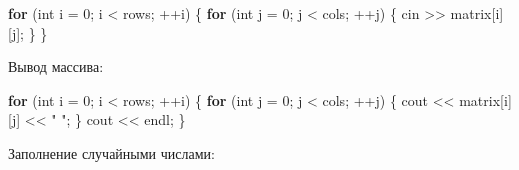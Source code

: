 \documentclass[
]{article}
\newenvironment{Shaded}{}{}
\newcommand{\ControlFlowTok}[1]{\textcolor[rgb]{0.00,0.44,0.13}{\textbf{#1}}}
\newcommand{\DataTypeTok}[1]{\textcolor[rgb]{0.56,0.13,0.00}{#1}}
\newcommand{\DecValTok}[1]{\textcolor[rgb]{0.25,0.63,0.44}{#1}}
\newcommand{\NormalTok}[1]{#1}
\newcommand{\OperatorTok}[1]{\textcolor[rgb]{0.40,0.40,0.40}{#1}}
\newcommand{\StringTok}[1]{\textcolor[rgb]{0.25,0.44,0.63}{#1}}
\begin{document}
\begin{enumerate}
\begin{Shaded}
\begin{Highlighting}[]
\ControlFlowTok{for} \OperatorTok{(}\DataTypeTok{int}\NormalTok{ i }\OperatorTok{=} \DecValTok{0}\OperatorTok{;}\NormalTok{ i }\OperatorTok{\textless{}}\NormalTok{ rows}\OperatorTok{;} \OperatorTok{++}\NormalTok{i}\OperatorTok{)} \OperatorTok{\{}
    \ControlFlowTok{for} \OperatorTok{(}\DataTypeTok{int}\NormalTok{ j }\OperatorTok{=} \DecValTok{0}\OperatorTok{;}\NormalTok{ j }\OperatorTok{\textless{}}\NormalTok{ cols}\OperatorTok{;} \OperatorTok{++}\NormalTok{j}\OperatorTok{)} \OperatorTok{\{}
\NormalTok{        cin }\OperatorTok{\textgreater{}\textgreater{}}\NormalTok{ matrix}\OperatorTok{[}\NormalTok{i}\OperatorTok{][}\NormalTok{j}\OperatorTok{];}
    \OperatorTok{\}}
\OperatorTok{\}}
\end{Highlighting}
\end{Shaded}

  Вывод массива:

\begin{Shaded}
\begin{Highlighting}[]
\ControlFlowTok{for} \OperatorTok{(}\DataTypeTok{int}\NormalTok{ i }\OperatorTok{=} \DecValTok{0}\OperatorTok{;}\NormalTok{ i }\OperatorTok{\textless{}}\NormalTok{ rows}\OperatorTok{;} \OperatorTok{++}\NormalTok{i}\OperatorTok{)} \OperatorTok{\{}
    \ControlFlowTok{for} \OperatorTok{(}\DataTypeTok{int}\NormalTok{ j }\OperatorTok{=} \DecValTok{0}\OperatorTok{;}\NormalTok{ j }\OperatorTok{\textless{}}\NormalTok{ cols}\OperatorTok{;} \OperatorTok{++}\NormalTok{j}\OperatorTok{)} \OperatorTok{\{}
\NormalTok{        cout }\OperatorTok{\textless{}\textless{}}\NormalTok{ matrix}\OperatorTok{[}\NormalTok{i}\OperatorTok{][}\NormalTok{j}\OperatorTok{]} \OperatorTok{\textless{}\textless{}} \StringTok{" "}\OperatorTok{;}
    \OperatorTok{\}}
\NormalTok{    cout }\OperatorTok{\textless{}\textless{}}\NormalTok{ endl}\OperatorTok{;}
\OperatorTok{\}}
\end{Highlighting}
\end{Shaded}

  Заполнение случайными числами:


\end{enumerate}
\end{document}
